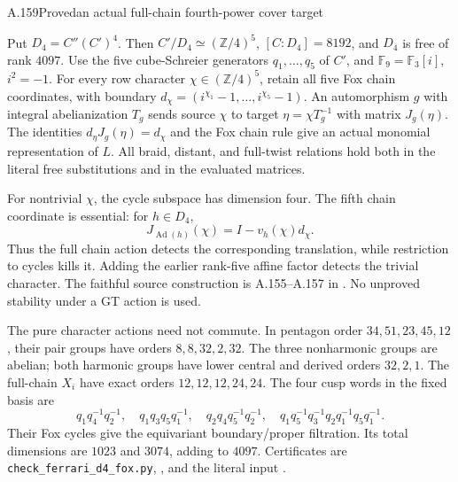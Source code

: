 \begin{statement}{A.159}{Proved}{an actual full-chain fourth-power cover target}
\end{statement}
Put $D_4=C''(C')^4$. Then $C'/D_4\simeq(\mathbb Z/4)^5$,
$[C:D_4]=8192$, and $D_4$ is free of rank $4097$.
Use the five cube-Schreier generators $q_1,\ldots,q_5$ of $C'$,
and $\mathbb F_9=\mathbb F_3[i]$, $i^2=-1$.
For every row character $\chi\in(\mathbb Z/4)^5$, retain all five
Fox chain coordinates, with boundary
$d_\chi=(i^{\chi_1}-1,\ldots,i^{\chi_5}-1)$.
An automorphism $g$ with integral abelianization $T_g$ sends source
$\chi$ to target $\eta=\chi T_g^{-1}$ with matrix $J_g(\eta)$.
The identities $d_\eta J_g(\eta)=d_\chi$ and the Fox chain rule
give an actual monomial representation of $L$.
All braid, distant, and full-twist relations hold both in the
literal free substitutions and in the evaluated matrices.

For nontrivial $\chi$, the cycle subspace has dimension four.
The fifth chain coordinate is essential: for $h\in D_4$,
\[
                  J_{\operatorname{Ad}(h)}(\chi)
                    =I-v_h(\chi)d_\chi.
 \tag{FP.54.1}
\]
Thus the full chain action detects the corresponding translation,
while restriction to cycles kills it. Adding the earlier rank-five
affine factor detects the trivial character. The faithful source
construction is A.155--A.157 in
.
No unproved stability under a GT action is used.

The pure character actions need not commute. In pentagon order
$34,51,23,45,12$, their pair groups have orders $8,8,32,2,32$.
The three nonharmonic groups are abelian; both harmonic groups
have lower central and derived orders $32,2,1$.
The full-chain $X_i$ have exact orders $12,12,12,24,24$.
The four cusp words in the fixed basis are
\[
 q_1q_4^{-1}q_2^{-1},\quad q_1q_3q_5q_1^{-1},\quad
 q_2q_4q_5^{-1}q_2^{-1},\quad
 q_1q_5^{-1}q_3^{-1}q_2q_1^{-1}q_5q_1^{-1}.
\]
Their Fox cycles give the equivariant boundary/proper filtration.
Its total dimensions are $1023$ and $3074$, adding to $4097$.
Certificates are \texttt{check\_ferrari\_d4\_fox.py},
, and the literal input
.

